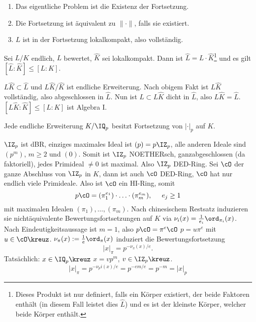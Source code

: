 \renewcommand{\lecdate}{27.01.2015}

\begin{Bemerkung}
 \begin{enumerate}
  \item Das eigentliche Problem ist die Existenz der Fortsetzung.
  \item Die Fortsetzung ist äquivalent zu $\|\cdot\|$, falls sie existiert.
  \item $L$ ist in der Fortsetzung lokalkompakt, also vollständig.
 \end{enumerate}
\end{Bemerkung}

\begin{Fakt}
 Sei $L/K$ endlich, $L$ bewertet, $\hat K$ sei lokalkompakt. Dann ist  $\hat L=L\cdot \hat K$\footnote{Dieses Produkt ist nur definiert, falls ein Körper existiert, der beide Faktoren enthält (in diesem Fall leistet dies $\hat L$) und es ist der kleinste Körper, welcher beide Körper enthält.} und es gilt $[\hat L:\hat K]\leq [L:K]$.
\end{Fakt}

\begin{Beweis}
 $L\hat K\subset \hat L$ und $L\hat K/\hat K$ ist endliche Erweiterung. Nach obigem Fakt ist $L\hat K$ vollständig, also abgeschlossen in $\hat L$. Nun ist $L\subset L\hat K$ dicht in $\hat L$, also $L\hat K=\hat L$.
 $[L\hat K:\hat K]\leq [L:K]$ ist Algebra I.
\end{Beweis}

\begin{Fakt}
 Jede endliche Erweiterung $K/\IQ_p$ besitzt Fortsetzung von $|\cdot|_p$ auf $K$.
\end{Fakt}

\begin{Beweis}
 $\IZ_p$ ist dBR, einziges maximales Ideal ist $(p)=p\IZ_p$, alle anderen Ideale sind $(p^m)$, $m\geq 2$ und $(0)$. Somit ist $\IZ_p$ NOETHERsch, ganzabgeschlossen (da faktoriell), jedes Primideal $\neq 0$ ist maximal. Also $\IZ_p$ DED-Ring. Sei $\cO$ der ganze Abschluss von $\IZ_p$ in $K$, dann ist auch $\cO$ DED-Ring, $\cO$ hat nur endlich viele Primideale. Also ist $\cO$ ein HI-Ring, somit 
 \[ p\cO = (\pi_1^{e_1})\cdot\ldots\cdot(\pi_m^{e_m}),\hspace{.5cm} e_j\geq 1\]
 mit maximalen Idealen $(\pi_1),\ldots,(\pi_m)$. Nach chinesischem Restsatz induzieren sie nichtäquivalente Bewertungsfortsetzungen auf $K$ via $\nu_i(x)=\frac{1}{e_i}\ord_{\pi_i}(x)$.
 Nach Eindeutigkeitsaussage ist $m=1$, also $p\cO=\pi^e\cO$ \folge $p=u \pi^e$ mit $u\in \cO\kreuz$. 
 $\nu_\pi(x):=\frac{1}{e}\ord_\pi(x)$ induziert die Bewertungsfortsetzung
 \[ |x|_\pi = p^{-\nu_\pi(x)/e}.\]
 Tatsächlich: $x\in\IQ_p\kreuz$ \folge $x=vp^m$, $v\in\IZ_p\kreuz$.
 \[ |x|_\pi=p^{-\nu_pi(x)/e}=p^{-em/e}=p^{-m}=|x|_p\]
\end{Beweis}

